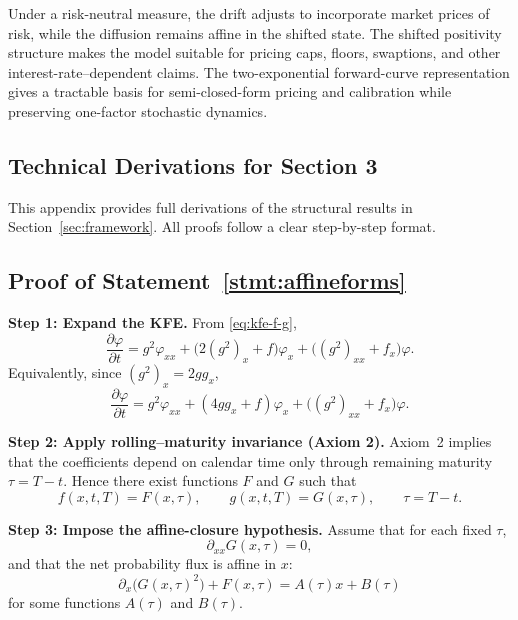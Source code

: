 \documentclass[12pt]{article}
\theoremstyle{statementstyle}
\begin{document}
Under a risk-neutral measure, the drift adjusts to incorporate market
prices of risk, while the diffusion remains affine in the shifted state.
The shifted positivity structure makes the model suitable for pricing
caps, floors, swaptions, and other interest-rate--dependent claims. The
two-exponential forward-curve representation gives a tractable basis for
semi-closed-form pricing and calibration while preserving one-factor
stochastic dynamics.
\begin{appendices}
\section{Technical Derivations for Section 3}
\label{appendix:A}

This appendix provides full derivations of the structural results in
Section~\ref{sec:framework}. All proofs follow a clear step-by-step
format.

\subsection{Proof of Statement~\ref{stmt:affineforms}}
\label{appendix:A1}
\medskip
\noindent\textbf{Step 1: Expand the KFE.}  
From \eqref{eq:kfe-f-g},
\begin{equation}
\frac{\partial\varphi}{\partial t}
=
g^{2}\varphi_{xx}
+
\bigl(2(g^{2})_{x}+f\bigr)\varphi_{x}
+
\bigl((g^{2})_{xx}+f_{x}\bigr)\varphi.
\tag{A.1.1}
\end{equation}
Equivalently, since \((g^{2})_{x}=2g g_{x}\),
\[
\frac{\partial\varphi}{\partial t}
=
g^{2}\varphi_{xx}
+
(4g g_{x}+f)\varphi_{x}
+
\bigl((g^{2})_{xx}+f_{x}\bigr)\varphi.
\]

\medskip
\noindent\textbf{Step 2: Apply rolling--maturity invariance (Axiom 2).}  
Axiom~2 implies that the coefficients depend on calendar time only through
remaining maturity \(\tau=T-t\). Hence there exist functions \(F\) and
\(G\) such that
\begin{equation}
f(x,t,T)=F(x,\tau),
\qquad
g(x,t,T)=G(x,\tau),
\qquad \tau=T-t.
\tag{A.1.2}
\end{equation}

\medskip
\noindent\textbf{Step 3: Impose the affine-closure hypothesis.}  
Assume that for each fixed \(\tau\),
\begin{equation}
\partial_{xx}G(x,\tau)=0,
\tag{A.1.3}\label{eq:A13}
\end{equation}
and that the net probability flux is affine in \(x\):
\begin{equation}
\partial_x\!\bigl(G(x,\tau)^2\bigr)+F(x,\tau)=A(\tau)x+B(\tau)
\tag{A.1.4}\label{eq:A14}
\end{equation}
for some functions \(A(\tau)\) and \(B(\tau)\).


\end{appendices}
\end{document}
